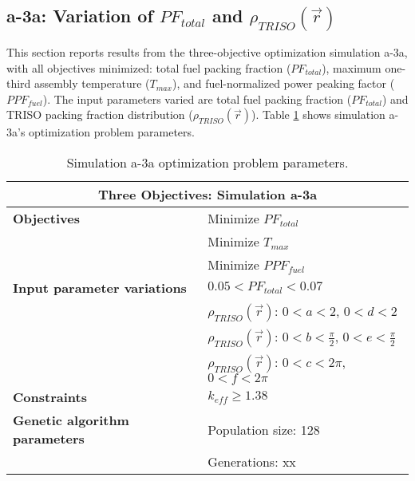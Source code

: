 \subsection{a-3a: Variation of $PF_{total}$ and $\rho_{TRISO}(\vec{r})$}
\label{sec:a-3a}
This section reports results from the three-objective optimization simulation a-3a, 
with all objectives minimized: total fuel packing fraction ($PF_{total}$), 
maximum one-third assembly temperature ($T_{max}$), and fuel-normalized power peaking 
factor ($PPF_{fuel}$).  
The input parameters varied are total fuel packing fraction ($PF_{total}$) and 
TRISO packing fraction distribution ($\rho_{TRISO}(\vec{r})$). 
Table \ref{tab:simulationa3a} shows simulation a-3a's optimization problem parameters. 
\begin{table}[htbp!]
    \centering
    \onehalfspacing
    \caption{Simulation a-3a optimization problem parameters.}
	\label{tab:simulationa3a}
    \footnotesize
    \begin{tabular}{l|p{5.3cm}}
    \hline 
    \multicolumn{2}{c}{\textbf{Three Objectives: Simulation a-3a}} \\
    \hline 
    \textbf{Objectives} & Minimize $PF_{total}$ \\
    & Minimize $T_{max}$ \\
    & Minimize $PPF_{fuel}$ \\
    \hline 
    \textbf{Input parameter variations} & $0.05<PF_{total}<0.07$ \\
    & $\rho_{TRISO}(\vec{r})$: $0<a<2$, $0<d<2$\\
    & $\rho_{TRISO}(\vec{r})$: $0<b<\frac{\pi}{2}$, $0<e<\frac{\pi}{2}$\\
    & $\rho_{TRISO}(\vec{r})$: $0<c<2\pi$, $0<f<2\pi$\\
    \hline
    \textbf{Constraints} & $k_{eff} \geq 1.38$\\ 
    \hline 
    \textbf{Genetic algorithm parameters} & Population size: 128 \\
    & Generations: xx \\
    \hline
    \end{tabular}
\end{table}

